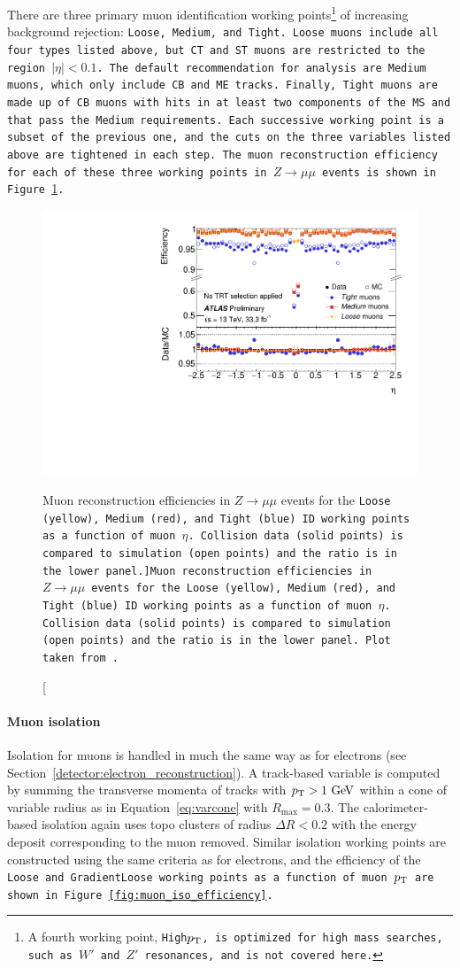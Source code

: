 There are three primary muon identification working points\footnote{A fourth working point, \tt{High$p_{\mathrm{T}}$}, is optimized for high mass searches, such as $W'$ and $Z'$ resonances, and is not covered here.} of increasing background rejection: \tt{Loose}, \tt{Medium}, and \tt{Tight}.
\tt{Loose} muons include all four types listed above, but CT and ST muons are restricted to the region $|\eta| < 0.1$.
The default recommendation for analysis are \tt{Medium} muons, which only include CB and ME tracks.
Finally, \tt{Tight} muons are made up of CB muons with hits in at least two components of the MS and that pass the \tt{Medium} requirements.
Each successive working point is a subset of the previous one, and the cuts on the three variables listed above are tightened in each step.
The muon reconstruction efficiency for each of these three working points in $Z\rightarrow\mu\mu$ events is shown in Figure~\ref{fig:muon_id_efficiency}.

\begin{figure}[htbp]
  \centering
  \includegraphics[width=.6\textwidth]{figs/detector/muon_id_efficiency}
  \caption[Muon reconstruction efficiencies in $Z\rightarrow\mu\mu$ events for the \tt{Loose} (yellow), \tt{Medium} (red), and \tt{Tight} (blue) ID working points as a function of muon $\eta$.  Collision data (solid points) is compared to simulation (open points) and the ratio is in the lower panel.]{Muon reconstruction efficiencies in $Z\rightarrow\mu\mu$ events for the \tt{Loose} (yellow), \tt{Medium} (red), and \tt{Tight} (blue) ID working points as a function of muon $\eta$.  Collision data (solid points) is compared to simulation (open points) and the ratio is in the lower panel.  Plot taken from~\cite{2017.muon-cp-plots}.}
  \label{fig:muon_id_efficiency}
\end{figure}

\paragraph*{Muon isolation}
Isolation for muons is handled in much the same way as for electrons (see Section~\ref{detector:electron_reconstruction}).
A track-based variable is computed by summing the transverse momenta of tracks with $\pt > 1\gev$ within a cone of variable radius as in Equation~\ref{eq:varcone} with $R_\textrm{max} = 0.3$.
The calorimeter-based isolation again uses topo clusters of radius $\Delta R < 0.2$ with the energy deposit corresponding to the muon removed.
Similar isolation working points are constructed using the same criteria as for electrons, and the efficiency of the \tt{Loose} and \tt{GradientLoose} working points as a function of muon $p_{\mathrm{T}}$ are shown in Figure~\ref{fig:muon_iso_efficiency}.

